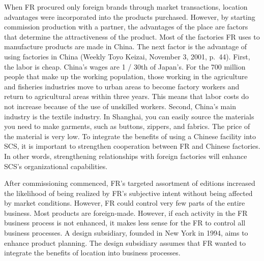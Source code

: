 \documentclass[12pt,]{article}
\begin{document}
When FR procured only foreign brands through market transactions,
location advantages were incorporated into the products purchased.
However, by starting commission production with a partner, the
advantages of the place are factors that determine the attractiveness of
the product. Most of the factories FR uses to manufacture products are
made in China. The next factor is the advantage of using factories in
China (Weekly Toyo Keizai, November 3, 2001, p.~44). First, the labor is
cheap. China's wages are 1 / 30th of Japan's. For the 700 million people
that make up the working population, those working in the agriculture
and fisheries industries move to urban areas to become factory workers
and return to agricultural areas within three years. This means that
labor costs do not increase because of the use of unskilled workers.
Second, China's main industry is the textile industry. In Shanghai, you
can easily source the materials you need to make garments, such as
buttons, zippers, and fabrics. The price of the material is very low. To
integrate the benefits of using a Chinese facility into SCS, it is
important to strengthen cooperation between FR and Chinese factories. In
other words, strengthening relationships with foreign factories will
enhance SCS's organizational capabilities.

After commissioning commenced, FR's targeted assortment of editions
increased the likelihood of being realized by FR's subjective intent
without being affected by market conditions. However, FR could control
very few parts of the entire business. Most products are foreign-made.
However, if each activity in the FR business process is not enhanced, it
makes less sense for the FR to control all business processes. A design
subsidiary, founded in New York in 1994, aims to enhance product
planning. The design subsidiary assumes that FR wanted to integrate the
benefits of location into business processes.
\end{document}
